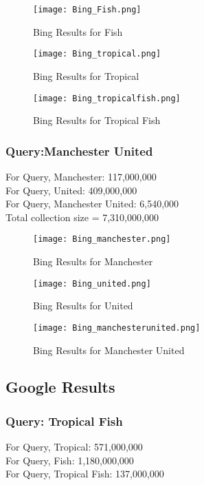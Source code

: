 \documentclass[12pt]{report}
\begin{document}
\begin{figure}[ht] 
  \centering
  \texttt{[image: Bing\_Fish.png]}
  \caption{Bing Results for Fish}
  \label{fig:13}
\end{figure}

\begin{figure}[ht] 
  \centering
  \texttt{[image: Bing\_tropical.png]}
  \caption{Bing Results for Tropical}
  \label{fig:14}
\end{figure}

\begin{figure}[ht] 
  \centering
  \texttt{[image: Bing\_tropicalfish.png]}
  \caption{Bing Results for Tropical Fish}
  \label{fig:15}
\end{figure}

\subsubsection{Query:Manchester United}
For Query, Manchester: 117,000,000\\
For Query, United: 409,000,000\\
For Query, Manchester United: 6,540,000\\

Total collection size = 7,310,000,000\\

\begin{figure}[ht] 
  \centering
  \texttt{[image: Bing\_manchester.png]}
  \caption{Bing Results for Manchester}
  \label{fig:16}
\end{figure}

\begin{figure}[ht] 
  \centering
  \texttt{[image: Bing\_united.png]}
  \caption{Bing Results for United}
  \label{fig:17}
\end{figure}

\begin{figure}[ht] 
  \centering
  \texttt{[image: Bing\_manchesterunited.png]}
  \caption{Bing Results for Manchester United}
  \label{fig:18}
\end{figure}

\subsection{Google Results}
\subsubsection{Query: Tropical Fish}
For Query, Tropical: 571,000,000\\
For Query, Fish: 1,180,000,000\\
For Query, Tropical Fish: 137,000,000\\
\end{document}
